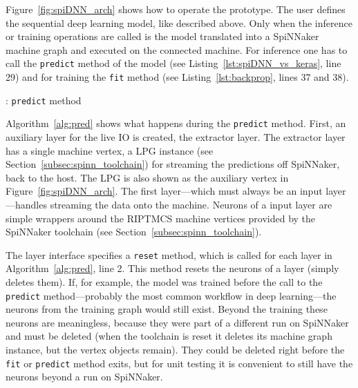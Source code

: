 \documentclass[]{article}
\begin{document}
Figure~\ref{fig:spiDNN_arch} shows how to operate the prototype.
The user defines the sequential deep learning model, like described
above.
Only when the inference or training operations are called is the
model translated into a SpiNNaker machine graph and executed on the
connected machine.
For inference one has to call the \texttt{predict} method of the model
(see Listing~\ref{lst:spiDNN_vs_keras}, line 29)
and for training the \texttt{fit} method
(see Listing~\ref{lst:backprop}, lines 37 and 38).

\begin{algorithm} %
  \caption{: \texttt{predict} method}
  \label{alg:pred}

  \begin{algorithmic}[1]
  \end{algorithmic}
\end{algorithm} %

Algorithm~\ref{alg:pred} shows what happens during the
\texttt{predict} method.
First, an auxiliary layer for the live IO is created, the extractor
layer.
The extractor layer has a single machine vertex, a LPG instance
(see Section~\ref{subsec:spinn_toolchain}) for streaming the
predictions off SpiNNaker, back to the host.
The LPG is also shown as the auxiliary vertex in
Figure~\ref{fig:spiDNN_arch}.
The first layer---which must always be an input layer---handles
streaming the data onto the machine.
Neurons of a input layer are simple wrappers around the RIPTMCS
machine vertices provided by the SpiNNaker toolchain (see
Section~\ref{subsec:spinn_toolchain}).

The layer interface specifies a \texttt{reset} method, which is
called for each layer in Algorithm~\ref{alg:pred}, line 2.
This method resets the neurons of a layer (simply deletes them).
If, for example, the model was trained before the call to the
\texttt{predict} method---probably the most common workflow in deep
learning---the neurons from the training graph would still exist.
Beyond the training these neurons are meaningless, because they were
part of a different run on SpiNNaker and must be deleted (when the
toolchain is reset it deletes its machine graph instance, but the
vertex objects remain).
They could be deleted right before the \texttt{fit} or
\texttt{predict} method exits, but for unit testing it is convenient
to still have the neurons beyond a run on SpiNNaker.
\end{document}
